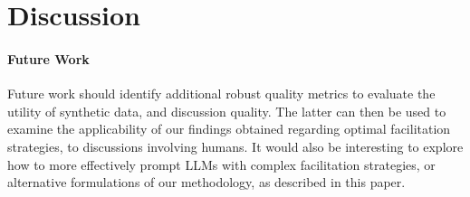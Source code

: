 %
\section{Discussion}
\paragraph{Future Work}Future work should identify additional robust quality metrics to evaluate the utility of synthetic data, and discussion quality. The latter can then be used to examine the applicability of our findings obtained regarding optimal facilitation strategies, to discussions involving humans. It would also be interesting to explore how to more effectively prompt LLMs with complex facilitation strategies, or alternative formulations of our methodology, as described in this paper.